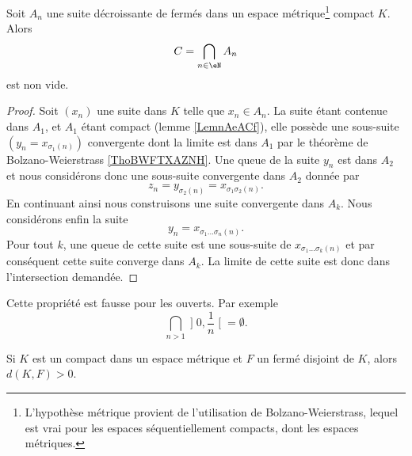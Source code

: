 \begin{lemma}       \label{LemooynkH}
    Soit \( A_n\) une suite décroissante de fermés dans un espace métrique\footnote{L'hypothèse métrique provient de l'utilisation de Bolzano-Weierstrass, lequel est vrai pour les espaces séquentiellement compacts, dont les espaces métriques.} compact \( K\). Alors
    \begin{equation}
        C=\bigcap_{n\in \eN}A_n
    \end{equation}
    est non vide. 
\end{lemma}

\begin{proof}
    Soit \( (x_n)\) une suite dans \( K\) telle que \( x_n\in A_n\). La suite étant contenue dans \( A_1\), et \( A_1\) étant compact (lemme \ref{LemnAeACf}), elle possède une sous-suite \( (y_n=x_{\sigma_1(n)})\) convergente dont la limite est dans \( A_1\) par le théorème de Bolzano-Weierstrass \ref{ThoBWFTXAZNH}. Une queue de la suite \( y_n\) est dans \( A_2\) et nous considérons donc une sous-suite convergente dans \( A_2\) donnée par
    \begin{equation}
        z_n=y_{\sigma_2(n)}=x_{\sigma_1\sigma_2(n)}.
    \end{equation}
    En continuant ainsi nous construisons une suite convergente dans \( A_k\). Nous considérons enfin la suite
    \begin{equation}
        y_n=x_{\sigma_1\ldots \sigma_n(n)}.
    \end{equation}
    Pour tout \( k\), une queue de cette suite est une sous-suite de \( x_{\sigma_1\ldots \sigma_k(n)}\) et par conséquent cette suite converge dans \( A_k\). La limite de cette suite est donc dans l'intersection demandée.
\end{proof}

\begin{remark}
    Cette propriété est fausse pour les ouverts. Par exemple
    \begin{equation}
        \bigcap_{n>1}\mathopen] 0 , \frac{1}{ n } \mathclose[=\emptyset.
    \end{equation}
\end{remark}

\begin{lemma}   \label{LemKIcAbic}
    Si \( K\) est un compact dans un espace métrique et \( F\) un fermé disjoint de \( K\), alors \( d(K,F)>0\).
\end{lemma}

